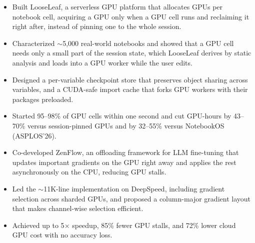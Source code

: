 \documentclass{resume}
\begin{document}
\vspace{-1.0em}
\begin{itemize}
  \item Built LooseLeaf, a serverless GPU platform that allocates GPUs per notebook cell, acquiring a GPU only when a GPU cell runs and reclaiming it right after, instead of pinning one to the whole session.
  \item Characterized $\sim$5,000 real-world notebooks and showed that a GPU cell needs only a small part of the session state, which LooseLeaf derives by static analysis and loads into a GPU worker while the user edits.
  \item Designed a per-variable checkpoint store that preserves object sharing across variables, and a CUDA-safe import cache that forks GPU workers with their packages preloaded.
  \item Started 95--98\% of GPU cells within one second and cut GPU-hours by 43--70\% versus session-pinned GPUs and by 32--55\% versus NotebookOS (ASPLOS'26).
\end{itemize}
\vspace{-1.0em}

\vspace{-1.0em}
\begin{itemize}
  \item Co-developed ZenFlow, an offloading framework for LLM fine-tuning that updates important gradients on the GPU right away and applies the rest asynchronously on the CPU, reducing GPU stalls.
  \item Led the $\sim$11K-line implementation on DeepSpeed, including gradient selection across sharded GPUs, and proposed a column-major gradient layout that makes channel-wise selection efficient.
  \item Achieved up to 5$\times$ speedup, 85\% fewer GPU stalls, and 72\% lower cloud GPU cost with no accuracy loss.
\end{itemize}
\vspace{-1.0em}
\end{document}
